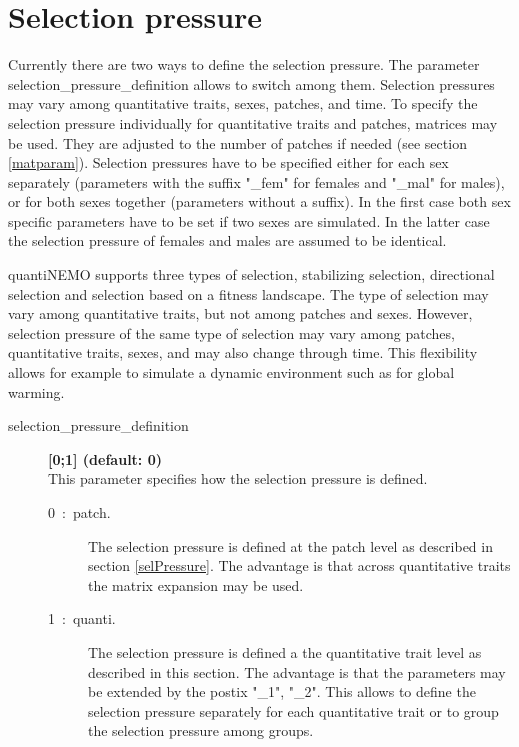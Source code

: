 \documentclass[letterpaper,12pt,oneside]{book}
\begin{document}
\section{Selection pressure}\label{selPressure2}
Currently there are two ways to define the selection pressure. The parameter \textsf{selection\_pressure\_definition} allows to switch among them. Selection pressures may vary among quantitative traits, sexes, patches, and time. To specify the selection pressure individually for quantitative traits and patches, matrices may be used. They are adjusted to the number of patches if needed (see section \ref{matparam}). Selection pressures have to be specified either for each sex separately (parameters with the suffix "\_fem" for females and "\_mal" for males), or for both sexes together (parameters without a suffix). In the first case both sex specific parameters have to be set if two sexes are simulated. In the latter case the selection pressure of females and males are assumed to be identical.

quantiNEMO supports three types of selection, stabilizing selection, directional selection and selection based on a fitness landscape. The type of selection may vary among quantitative traits, but not among patches and sexes. However, selection pressure of the same type of selection may vary among patches, quantitative traits, sexes, and may also change through time. This flexibility allows for example to simulate a dynamic environment such as for global warming. 

\begin{description}
\item[selection\_pressure\_definition\index{}]\textbf{[0;1] (default: 0)}\\
This parameter specifies how the selection pressure is defined. 
\begin{description}
\item[0~:~patch.] The selection pressure is defined at the patch level as described in section \ref{selPressure}. The advantage is that across quantitative traits the matrix expansion may be used.
\item[1~:~quanti.] The selection pressure is defined a the quantitative trait level as described in this section. The advantage is that the parameters may be extended by the postix "\_1", "\_2". This allows to define the selection pressure separately for each quantitative trait or to group the selection pressure among groups.
\end{description}
\end{description}
\end{document}
